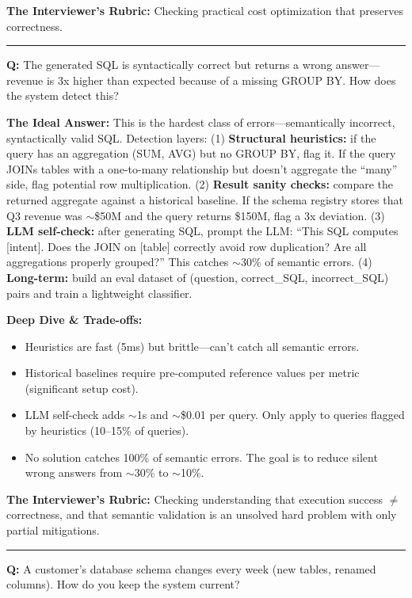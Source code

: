 \textbf{The Interviewer's Rubric:} Checking practical cost optimization that preserves correctness.

\bigskip\hrule\bigskip

\textbf{Q:} The generated SQL is syntactically correct but returns a wrong answer---revenue is 3x higher than expected because of a missing GROUP BY. How does the system detect this?

\textbf{The Ideal Answer:} This is the hardest class of errors---semantically incorrect, syntactically valid SQL. Detection layers: (1) \textbf{Structural heuristics:} if the query has an aggregation (SUM, AVG) but no GROUP BY, flag it. If the query JOINs tables with a one-to-many relationship but doesn't aggregate the ``many'' side, flag potential row multiplication. (2) \textbf{Result sanity checks:} compare the returned aggregate against a historical baseline. If the schema registry stores that Q3 revenue was $\sim$\$50M and the query returns \$150M, flag a 3x deviation. (3) \textbf{LLM self-check:} after generating SQL, prompt the LLM: ``This SQL computes [intent]. Does the JOIN on [table] correctly avoid row duplication? Are all aggregations properly grouped?'' This catches $\sim$30\% of semantic errors. (4) \textbf{Long-term:} build an eval dataset of (question, correct\_SQL, incorrect\_SQL) pairs and train a lightweight classifier.

\textbf{Deep Dive \& Trade-offs:}
\begin{itemize}
  \item Heuristics are fast (5ms) but brittle---can't catch all semantic errors.
  \item Historical baselines require pre-computed reference values per metric (significant setup cost).
  \item LLM self-check adds $\sim$1s and $\sim$\$0.01 per query. Only apply to queries flagged by heuristics (10--15\% of queries).
  \item No solution catches 100\% of semantic errors. The goal is to reduce silent wrong answers from $\sim$30\% to $\sim$10\%.
\end{itemize}

\textbf{The Interviewer's Rubric:} Checking understanding that execution success $\neq$ correctness, and that semantic validation is an unsolved hard problem with only partial mitigations.

\bigskip\hrule\bigskip

\textbf{Q:} A customer's database schema changes every week (new tables, renamed columns). How do you keep the system current?

